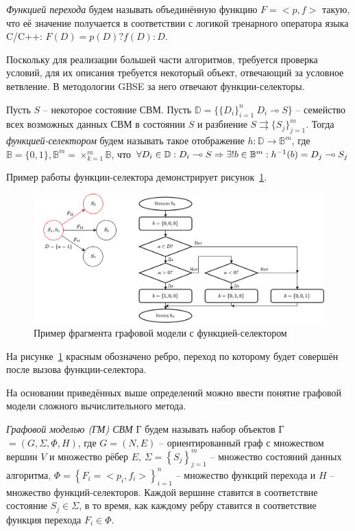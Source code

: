 \begin{definition}
    \emph{Функцией перехода} будем называть объединённую функцию $F = <p,f>$ такую, что её значение получается в соответствии с логикой тренарного оператора языка C/C++: $F(D) = p(D) ? f(D): D$.
\end{definition}

Поскольку для реализации большей части алгоритмов, требуется проверка условий, для их описания требуется некоторый объект, отвечающий за условное ветвление. В методологии GBSE за него отвечают функции-селекторы.

\begin{definition}
    Пусть $S$ -- некоторое состояние СВМ. Пусть $\mathbb{D}=\{\{D_i\}^n_{i=1}\:D_i \multimap S\}$ -- семейство всех возможных данных СВМ в состоянии $S$ и разбиение $S \rightrightarrows \{S_j\}^m_{j=1}$. Тогда \emph{функцией-селектором} будем называть такое отображение $h : \mathbb{D} \rightarrow \mathbb{B}^m$, где $\mathbb{B} = \{0, 1\}, \mathbb{B}^m=\times^m_{k=1}\mathbb{B}$, что $\forall D_i \in \mathbb{D} : D_i \multimap S \Rightarrow \exists!\boldmath{b}\in \mathbb{B}^m: h^{-1}(\boldmath{b})=D_j \multimap S_j$
\end{definition}

Пример работы функции-селектора демонстрирует рисунок~\ref{fig:graphSelector}.

\begin{figure}[H]
    \centering
    \includegraphics[width=\textwidth]{figures/example.selector.png}
    \caption{Пример фрагмента графовой модели с функцией-селектором}
    \label{fig:graphSelector}
\end{figure}

На рисунке~\ref{fig:graphSelector} красным обозначено ребро, переход по которому будет совершён после вызова функции-селектора.

На основании приведённых выше определений можно ввести понятие графовой модели сложного вычислительного метода.
\begin{definition}
    \emph{Графовой моделью (ГМ) СВМ} Г будем называть набор объектов Г$=(G, \Sigma, \Phi, H)$, где $G=(N, E)$ -- ориентированный граф с множеством вершин $V$ и множество рёбер $E$, $\Sigma=\left\{S_j\right\}^m_{j=1}$ -- множество состояний данных алгоритма, $\Phi=\left\{F_i=<p_i, f_i>\right\}^n_{i=1}$ -- множество функций перехода и $H$ -- множество функций-селекторов. Каждой вершине ставится в соответствие состояние $S_j\in\Sigma$, в то время, как каждому ребру ставится в соответствие функция перехода $F_i\in\Phi$.
\end{definition}


